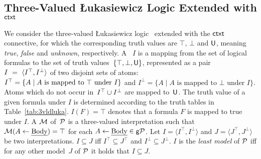 \documentclass[12pt]{article}
\begin{document}
\subsection{Three-Valued {\L}ukasiewicz Logic Extended with $\mathsf{ctxt}$} \label{sub:3valuedL}

We consider the three-valued {\L}ukasiewicz logic~\cite{lukasiewicz:20}
extended with the $\mathsf{ctxt}$ connective, for which the
corresponding truth values are $\top$, $\bot$ and $\mathsf{U}$, meaning \textit{true}, \textit{false}
and \textit{unknown}, respectively.
A ~$I$ is a mapping from the set of
logical formulas to the set
of truth values~$\{ \mathbf{\top}, \bot, \mathsf{U}\}$, represented as a pair~$I~=~\langle I^{\mathbf{\top}},I^\bot \rangle$ of two disjoint sets of atoms:  $I^{\mathbf{\top}} =  \{A \mid A \mbox{ is mapped to } \mathbf{\top} \mbox{ under } I\}$ and $I^\bot = \{A \mid A \mbox{ is mapped to } \bot \mbox{ under } I \}$.
Atoms which do not occur in~$I^{\mathbf{\top}} \cup I^\bot$ are mapped to~$\mathsf{U}$.
The truth value of a given formula
under $I$ is determined according to the truth tables in
Table~\ref{tab:3vldluka}.
$I(F) = \top$ denotes that a formula $F$ is mapped to true under $I$.
A  ${\cal M}$ of~${\cal P}$ is a three-valued interpretation such that
${\cal M}(A \leftarrow \mbox{\em Body}) = \mathbf{\top}$ for each $A \leftarrow \mbox{\em Body} \in \mathsf{g}{\cal P}$.
Let $I = \langle I^\top, I^\bot \rangle$ and $J = \langle J^\top,
J^\bot \rangle$ be two interpretations.
$I \subseteq J$ iff $I^\top \subseteq J^\top$ and $I^\bot \subseteq J^\bot$. $I$ is the \textit{least model} of ${\cal P}$
iff for any other model~$J$ of ${\cal P}$ it holds that $I \subseteq J$.
\end{document}
